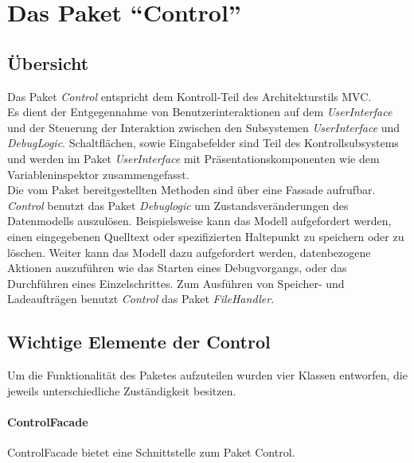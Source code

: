 \documentclass[parskip=full]{scrartcl}
\begin{document}
\section{Das Paket \enquote{Control}}
\label{Control}
\subsection{Übersicht}
    Das Paket \textit{Control} entspricht dem Kontroll-Teil des Architekturstils MVC.\\
    Es dient der Entgegennahme von Benutzerinteraktionen auf dem \textit{UserInterface} und der Steuerung der Interaktion zwischen den Subsystemen \textit{UserInterface} und \textit{DebugLogic}.
    Schaltflächen, sowie Eingabefelder sind Teil des Kontrollsubsystems und werden im Paket \textit{UserInterface} mit Präsentationskomponenten wie dem Variableninspektor zusammengefasst.\\
    Die vom Paket bereitgestellten Methoden sind über eine Fassade aufrufbar.\\
    \textit{Control} benutzt das Paket \textit{Debuglogic} um Zustandsveränderungen des Datenmodells auszulösen.
    Beispielsweise kann das Modell aufgefordert werden, einen eingegebenen Quelltext oder spezifizierten Haltepunkt zu speichern oder zu löschen. 
    Weiter kann das Modell dazu aufgefordert werden, datenbezogene Aktionen auszuführen wie das Starten eines Debugvorgangs, oder das Durchführen eines Einzelschrittes. 
    Zum Ausführen von Speicher- und Ladeaufträgen benutzt \textit{Control} das Paket \textit{FileHandler}.
\subsection{Wichtige Elemente der Control}
    Um die Funktionalität des Paketes aufzuteilen wurden vier Klassen entworfen, die jeweils unterschiedliche Zuständigkeit besitzen.
\paragraph{ControlFacade}
    ControlFacade bietet eine Schnittstelle zum Paket Control.
\end{document}
